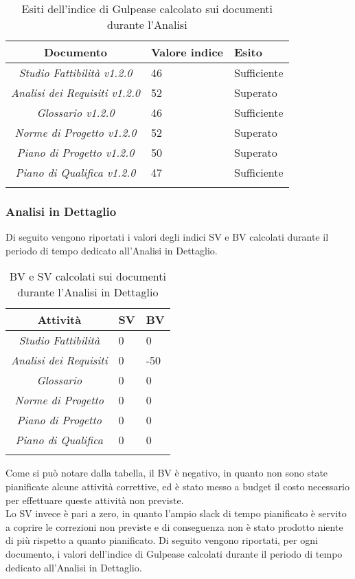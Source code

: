 \begin{longtable}{|c|p{3cm}|p{3cm}|}
\toprule
\textbf{Documento} & \textbf{Valore indice} & \textbf{Esito} \\


\midrule
\emph{Studio Fattibilità v1.2.0} & 46 & Sufficiente\\
\midrule
\emph{Analisi dei Requisiti v1.2.0} & 52 & Superato\\
\midrule
\emph{Glossario v1.2.0} & 46 & Sufficiente\\
\midrule
\emph{Norme di Progetto v1.2.0} & 52 & Superato\\
\midrule
\emph{Piano di Progetto v1.2.0} & 50 & Superato\\
\midrule
\emph{Piano di Qualifica v1.2.0} & 47 & Sufficiente\\
\bottomrule
\caption{Esiti dell'indice di Gulpease calcolato sui documenti durante l'Analisi}
\label{tab:changelog}
\end{longtable}
\subsubsection{Analisi in Dettaglio}
Di seguito vengono riportati i valori degli indici SV e BV calcolati durante il periodo di tempo dedicato all'Analisi in Dettaglio.
\begin{longtable}{|c|p{3cm}|p{3cm}|}
\toprule
\textbf{Attività} & \textbf{SV} & \textbf{BV} \\


\midrule
\emph{Studio Fattibilità} & 0 & 0 \\
\midrule
\emph{Analisi dei Requisiti} & 0 & -50\\
\midrule
\emph{Glossario} & 0  & 0\\
\midrule
\emph{Norme di Progetto} & 0 & 0\\
\midrule
\emph{Piano di Progetto} & 0 & 0\\
\midrule
\emph{Piano di Qualifica} & 0 & 0\\
\bottomrule
\caption{BV e SV calcolati sui documenti durante l'Analisi in Dettaglio}
\label{tab:changelog}
\end{longtable}
Come si può notare dalla tabella, il BV è negativo, in quanto non sono state pianificate alcune attività correttive, ed è stato messo a budget il costo necessario per effettuare queste attività non previste.\\
Lo SV invece è pari a zero, in quanto l'ampio slack di tempo pianificato è servito a coprire le correzioni non previste e di conseguenza non è stato prodotto niente di più rispetto a quanto pianificato. 
Di seguito vengono riportati, per ogni documento, i valori dell'indice di Gulpease calcolati durante il periodo di tempo dedicato all'Analisi in Dettaglio.

